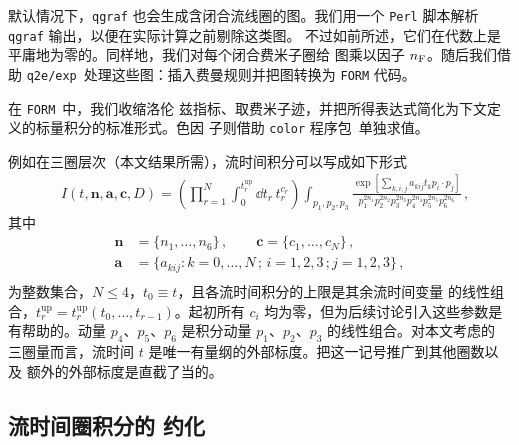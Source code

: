 默认情况下，\texttt{qgraf} 也会生成含闭合流线圈的图。我们用一个
\texttt{Perl} 脚本解析 \texttt{qgraf} 输出，以便在实际计算之前剔除这类图。
不过如前所述，它们在代数上是平庸地为零的。同样地，我们对每个闭合费米子圈给
图乘以因子 $n_\mathrm{F}$。随后我们借助 \texttt{q2e/exp}\,\cite{Harlander:1997zb,
Seidensticker:1999bb} 处理这些图：插入费曼规则并把图转换为 \texttt{FORM}
代码。

在 \texttt{FORM}\,\cite{Vermaseren:2000nd, Kuipers:2012rf} 中，我们收缩洛伦
兹指标、取费米子迹，并把所得表达式简化为下文定义的标量积分的标准形式。色因
子则借助 \texttt{color} 程序包\,\cite{vanRitbergen:1998pn} 单独求值。


例如在三圈层次（本文结果所需），流时间积分可以写成如下形式
\begin{equation}
\begin{split}
&I(t,\mathbf{n},\mathbf{a},\mathbf{c},D) =
  \left(\prod_{r=1}^N\int_0^{t_{r}^\text{up}}\dd
  t_r\,t_r^{c_r}\right)\int_{p_1,p_2,p_3} \frac{\exp[\sum_{k,i,j}
      a_{kij} t_k p_i \cdot p_j] }{p_1^{2n_1}p_2^{2n_2}p_3^{2n_3}
    p_4^{2n_4}p_5^{2n_5}p_6^{2n_6}}\,,
\label{eq:intrep}
\end{split}
\end{equation}
其中
\begin{equation}
\begin{split}
\mathbf{n} &= \{n_1,\ldots,n_6\}\,,\qquad
\mathbf{c} = \{c_1,\ldots,c_N\}\,,\\
\mathbf{a} &= \{a_{kij}:k=0,\ldots, N\,;\,i=1,2,3\,;j=1,2,3\}\,,\\
\end{split}
\end{equation}
为整数集合，$N\leq 4$，$t_0\equiv t$，且各流时间积分的上限是其余流时间变量
的线性组合，$t_r^\text{up}=t_r^{\text{up}}(t_0,\ldots,
t_{r-1})$。起初所有 $c_i$ 均为零，但为后续讨论引入这些参数是有帮助的。动量
$p_4$、$p_5$、$p_6$ 是积分动量 $p_1$、$p_2$、$p_3$ 的线性组合。对本文考虑的
三圈量而言，流时间 $t$ 是唯一有量纲的外部标度。把这一记号推广到其他圈数以及
额外的外部标度是直截了当的。

\subsection{流时间圈积分的  约化}\label{sec:reduction}

